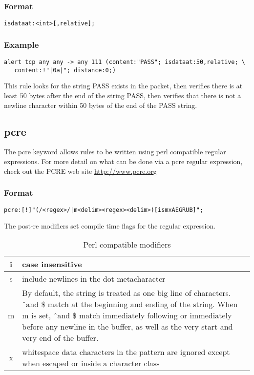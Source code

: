 \documentclass[english]{report}
\begin{document}
\subsubsection{Format}

\begin{verbatim}
isdataat:<int>[,relative];
\end{verbatim}

\subsubsection{Example}
\begin{verbatim}
alert tcp any any -> any 111 (content:"PASS"; isdataat:50,relative; \ 
   content:!"|0a|"; distance:0;)
\end{verbatim}
This rule looks for the string PASS exists in the packet, then verifies there
is at least 50 bytes after the end of the string PASS, then verifies that there
is not a newline character within 50 bytes of the end of the PASS string.

\subsection{pcre \label{pcre}}
The pcre keyword allows rules to be written using perl compatible regular expressions.   
For more detail on what can be done via a pcre regular expression, check out the PCRE web site \url{http://www.pcre.org}

\subsubsection{Format}
\begin{verbatim}
pcre:[!]"(/<regex>/|m<delim><regex><delim>)[ismxAEGRUB]";
\end{verbatim}
The post-re modifiers set compile time flags for the regular expression.

\begin{longtable}{|c|p{3.5in}|}
\caption{Perl compatible modifiers} \\
\hline
i & case insensitive \\
\hline
s & include newlines in the dot metacharacter \\
\hline
m & By default, the string is treated as one big line of characters.  \^\ and \$ match at the beginning and ending of the string. When m is set, \^\ and \$  match immediately following or immediately before any newline in the buffer, as well as the very start and very end of the buffer. \\
\hline
x & whitespace  data characters in the pattern are ignored except when escaped or inside a character class \\
\hline
\end{longtable}
\end{document}
